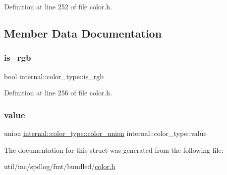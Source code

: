 Definition at line 252 of file color.\+h.



\subsection{Member Data Documentation}
\mbox{\label{structinternal_1_1color__type_ac4c20ebcaa52cafe86f90ba580183845}} 
\subsubsection{\texorpdfstring{is\+\_\+rgb}{is\_rgb}}
{\footnotesize\ttfamily bool internal\+::color\+\_\+type\+::is\+\_\+rgb}



Definition at line 256 of file color.\+h.

\mbox{\label{structinternal_1_1color__type_ad7ac9b3ff11c9da97b0da326708ba530}} 
\subsubsection{\texorpdfstring{value}{value}}
{\footnotesize\ttfamily union \hyperlink{unioninternal_1_1color__type_1_1color__union}{internal\+::color\+\_\+type\+::color\+\_\+union}  internal\+::color\+\_\+type\+::value}



The documentation for this struct was generated from the following file\+:\begin{DoxyCompactItemize}
\item 
util/inc/spdlog/fmt/bundled/\hyperlink{color_8h}{color.\+h}\end{DoxyCompactItemize}
